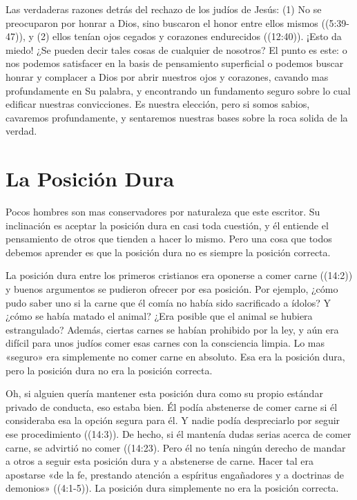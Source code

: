 \documentclass[12pt, twoside, openright]{book}
\begin{document}
Las verdaderas razones detrás del rechazo de los judíos de Jesús: (1) No se preocuparon por honrar a Dios, sino buscaron el honor entre ellos mismos ((5:39-47)), y (2) ellos tenían ojos cegados y corazones endurecidos ((12:40)). ¡Esto da miedo! ¿Se pueden decir tales cosas de cualquier de nosotros? El punto es este: o nos podemos satisfacer en la basis de pensamiento superficial o podemos buscar honrar y complacer a Dios por abrir nuestros ojos y corazones, cavando mas profundamente en Su palabra, y encontrando un fundamento seguro sobre lo cual edificar nuestras convicciones. Es nuestra elección, pero si somos sabios, cavaremos profundamente, y sentaremos nuestras bases sobre la roca solida de la verdad. 

\section{La Posición Dura}
Pocos hombres son mas conservadores por naturaleza que este escritor. Su inclinación es aceptar la posición dura en casi toda cuestión, y él entiende el pensamiento de otros que tienden a hacer lo mismo. Pero una cosa que todos debemos aprender es que la posición dura no es siempre la posición correcta. 

La posición dura entre los primeros cristianos era oponerse a comer carne ((14:2)) y buenos argumentos se pudieron ofrecer por esa posición. Por ejemplo, ¿cómo pudo saber uno si la carne que él comía no había sido sacrificado a ídolos? Y ¿cómo se había matado el animal? ¿Era posible que el animal se hubiera estrangulado? Además, ciertas carnes se habían prohibido por la ley, y aún era difícil para unos judíos comer esas carnes con la consciencia limpia. Lo mas «seguro» era simplemente no comer carne en absoluto. Esa era la posición dura, pero la posición dura no era la posición correcta. 

Oh, si alguien quería mantener esta posición dura como su propio estándar privado de conducta, eso estaba bien. Él podía abstenerse de comer carne si él consideraba esa la opción segura para él. Y nadie podía despreciarlo por seguir ese procedimiento ((14:3)). De hecho, si él mantenía dudas serias acerca de comer carne, se advirtió no comer ((14:23). Pero él no tenía ningún derecho de mandar a otros a seguir esta posición dura y a abstenerse de carne. Hacer tal era apostarse «de la fe, prestando atención a espíritus engañadores y a doctrinas de demonios» ((4:1-5)). La posición dura simplemente no era la posición correcta. 
\end{document}
